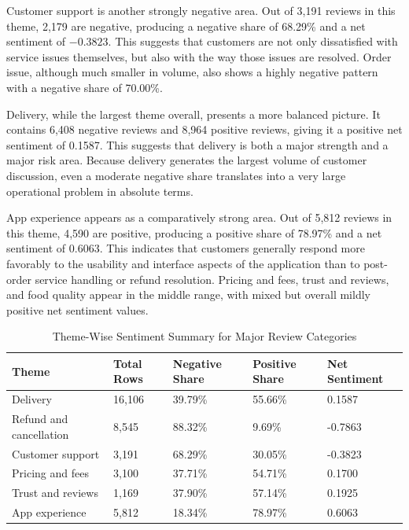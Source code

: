 Customer support is another strongly negative area. Out of 3,191 reviews in this theme, 2,179 are negative, producing a negative share of 68.29\% and a net sentiment of $-0.3823$. This suggests that customers are not only dissatisfied with service issues themselves, but also with the way those issues are resolved. Order issue, although much smaller in volume, also shows a highly negative pattern with a negative share of 70.00\%.

Delivery, while the largest theme overall, presents a more balanced picture. It contains 6,408 negative reviews and 8,964 positive reviews, giving it a positive net sentiment of 0.1587. This suggests that delivery is both a major strength and a major risk area. Because delivery generates the largest volume of customer discussion, even a moderate negative share translates into a very large operational problem in absolute terms.

App experience appears as a comparatively strong area. Out of 5,812 reviews in this theme, 4,590 are positive, producing a positive share of 78.97\% and a net sentiment of 0.6063. This indicates that customers generally respond more favorably to the usability and interface aspects of the application than to post-order service handling or refund resolution. Pricing and fees, trust and reviews, and food quality appear in the middle range, with mixed but overall mildly positive net sentiment values.


\begin{table}[h]
\centering
\caption{Theme-Wise Sentiment Summary for Major Review Categories}
\small
\begin{tabular}{L{0.27\textwidth}C{0.14\textwidth}C{0.16\textwidth}C{0.16\textwidth}C{0.14\textwidth}}
\toprule
\textbf{Theme} & \textbf{Total Rows} & \textbf{Negative Share} & \textbf{Positive Share} & \textbf{Net Sentiment} \\
\midrule
Delivery & 16,106 & 39.79\% & 55.66\% & 0.1587 \\
Refund and cancellation & 8,545 & 88.32\% & 9.69\% & -0.7863 \\
Customer support & 3,191 & 68.29\% & 30.05\% & -0.3823 \\
Pricing and fees & 3,100 & 37.71\% & 54.71\% & 0.1700 \\
Trust and reviews & 1,169 & 37.90\% & 57.14\% & 0.1925 \\
App experience & 5,812 & 18.34\% & 78.97\% & 0.6063 \\
\bottomrule
\end{tabular}
\normalsize
\end{table}

